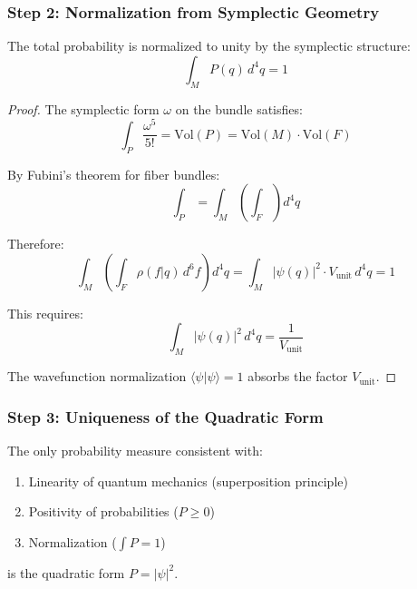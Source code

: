 \subsubsection{Step 2: Normalization from Symplectic Geometry}

\begin{theorem}
The total probability is normalized to unity by the symplectic structure:
\begin{equation}
    \int_M P(q) \, d^4q = 1
\end{equation}
\end{theorem}

\begin{proof}
The symplectic form $\omega$ on the bundle satisfies:
\begin{equation}
    \int_P \frac{\omega^5}{5!} = \text{Vol}(P) = \text{Vol}(M) \cdot \text{Vol}(F)
\end{equation}

By Fubini's theorem for fiber bundles:
\begin{equation}
    \int_P = \int_M \left(\int_F \right) d^4q
\end{equation}

Therefore:
\begin{equation}
    \int_M \left(\int_F \rho(f|q) \, d^6f\right) d^4q = \int_M |\psi(q)|^2 \cdot V_{\text{unit}} \, d^4q = 1
\end{equation}

This requires:
\begin{equation}
    \int_M |\psi(q)|^2 \, d^4q = \frac{1}{V_{\text{unit}}}
\end{equation}

The wavefunction normalization $\langle\psi|\psi\rangle = 1$ absorbs the factor $V_{\text{unit}}$.
\end{proof}

\subsubsection{Step 3: Uniqueness of the Quadratic Form}

\begin{theorem}
The only probability measure consistent with:
\begin{enumerate}
    \item Linearity of quantum mechanics (superposition principle)
    \item Positivity of probabilities ($P \geq 0$)
    \item Normalization ($\int P = 1$)
\end{enumerate}
is the quadratic form $P = |\psi|^2$.
\end{theorem}

